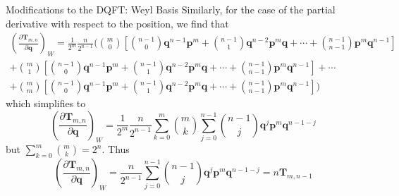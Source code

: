 \documentclass[aspectratio=169]{beamer}
\begin{document}
\begin{frame}[allowframebreaks]{Modifications to the DQFT: Weyl Basis}
		\framebreak
		Similarly, for the case of the partial derivative with respect to the position, we find that
		\begin{multline}
			\left( \frac{\partial\textbf{T}_{m,n}}{\partial\textbf{q}}\right)_W=\frac{1}{2^m}\frac{n}{2^{n-1}}\biggl(\binom{m}{0}\left[\binom{n-1}{0}\textbf{q}^{n-1}\textbf{p}^m+\binom{n-1}{1}\textbf{q}^{n-2}\textbf{p}^m\textbf{q}+\cdots+\binom{n-1}{n-1}\textbf{p}^m\textbf{q}^{n-1}\right]\\+\binom{m}{1}\left[\binom{n-1}{0}\textbf{q}^{n-1}\textbf{p}^m+\binom{n-1}{1}\textbf{q}^{n-2}\textbf{p}^m\textbf{q}+\cdots+\binom{n-1}{n-1}\textbf{p}^m\textbf{q}^{n-1}\right]+\cdots\\+\binom{m}{m}\left[\binom{n-1}{0}\textbf{q}^{n-1}\textbf{p}^m+\binom{n-1}{1}\textbf{q}^{n-2}\textbf{p}^m\textbf{q}+\cdots+\binom{n-1}{n-1}\textbf{p}^m\textbf{q}^{n-1}\right]\biggr) 
		\end{multline}
		which simplifies to
		\begin{equation}
			\left( \frac{\partial\textbf{T}_{m,n}}{\partial\textbf{q}}\right)_W=\frac{1}{2^m}\frac{n}{2^{n-1}}\sum_{k=0}^m\binom{m}{k}\sum_{j=0}^{n-1}\binom{n-1}{j}\textbf{q}^j\textbf{p}^{m}\textbf{q}^{n-1-j}
		\end{equation}
		but $\displaystyle\sum_{k=0}^m\binom{m}{k}=2^n$. Thus
		\begin{equation}
			\left( \frac{\partial\textbf{T}_{m,n}}{\partial\textbf{q}}\right)_W=\frac{n}{2^{n-1}}
			\sum_{j=0}^{n-1}\binom{n-1}{j}\textbf{q}^j\textbf{p}^{m}\textbf{q}^{n-1-j}=n\textbf{T}_{m,n-1}
		\end{equation}
		

\end{frame}
\end{document}
